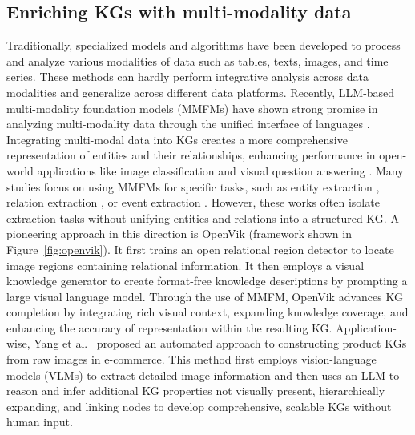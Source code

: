 \subsection{Enriching KGs with multi-modality data}
Traditionally, specialized models and algorithms have been developed to process and analyze various modalities of data such as tables, texts, images, and time series. These methods can hardly perform integrative analysis across data modalities and generalize across different data platforms. Recently, LLM-based multi-modality foundation models (MMFMs) have shown strong promise in analyzing multi-modality data through the unified interface of languages \cite{yang2023dawn, fei2022towards, li2024multimodal, li2024llava, zhang2023biomedgpt}.
Integrating multi-modal data into KGs creates a more comprehensive representation of entities and their relationships, enhancing performance in open-world applications like image classification and visual question answering \cite{chen2024knowledge}. Many studies focus on using MMFMs for specific tasks, such as entity extraction \cite{sun2024umie,li2023prompting,hu2023prompt}, relation extraction \cite{yu2023visually,li2024zero,li2024pixels}, or event extraction \cite{chen2024schema,rasheed2024glamm}. However, these works often isolate extraction tasks without unifying entities and relations into a structured KG.
{A pioneering approach in this direction is OpenVik \cite{cui2024open} (framework shown in Figure~\ref{fig:openvik}). It first trains an open relational region detector to locate image regions containing relational information. 
It then employs a visual knowledge generator to create format-free knowledge descriptions by prompting a large visual language model. Through the use of MMFM, OpenVik advances KG completion by integrating rich visual context, expanding knowledge coverage, and enhancing the accuracy of representation within the resulting KG.}
Application-wise, Yang et al.~\cite{yang2024hierarchical}  proposed an automated approach to constructing product KGs from raw images in e-commerce. This method first employs vision-language models (VLMs) to extract detailed image information and then uses an LLM to reason and infer additional KG properties not visually present, hierarchically expanding, and linking nodes to develop comprehensive, scalable KGs without human input.


